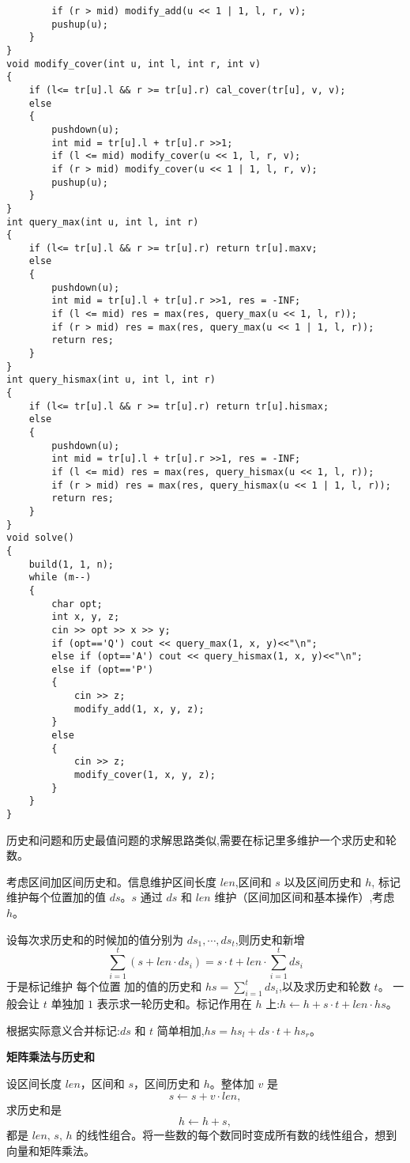 \documentclass[a4paper, fontset=none]{ctexart}
\begin{document}
\begin{verbatim}
        if (r > mid) modify_add(u << 1 | 1, l, r, v);
        pushup(u);
    }
}
void modify_cover(int u, int l, int r, int v)
{
    if (l<= tr[u].l && r >= tr[u].r) cal_cover(tr[u], v, v);
    else
    {
        pushdown(u);
        int mid = tr[u].l + tr[u].r >>1;
        if (l <= mid) modify_cover(u << 1, l, r, v);
        if (r > mid) modify_cover(u << 1 | 1, l, r, v);
        pushup(u);
    }
}
int query_max(int u, int l, int r)
{
    if (l<= tr[u].l && r >= tr[u].r) return tr[u].maxv;
    else
    {
        pushdown(u);
        int mid = tr[u].l + tr[u].r >>1, res = -INF;
        if (l <= mid) res = max(res, query_max(u << 1, l, r));
        if (r > mid) res = max(res, query_max(u << 1 | 1, l, r));
        return res;
    }
}
int query_hismax(int u, int l, int r)
{
    if (l<= tr[u].l && r >= tr[u].r) return tr[u].hismax;
    else
    {
        pushdown(u);
        int mid = tr[u].l + tr[u].r >>1, res = -INF;
        if (l <= mid) res = max(res, query_hismax(u << 1, l, r));
        if (r > mid) res = max(res, query_hismax(u << 1 | 1, l, r));
        return res;
    }
}
void solve()
{
    build(1, 1, n);
    while (m--)
    {
        char opt;
        int x, y, z;
        cin >> opt >> x >> y;
        if (opt=='Q') cout << query_max(1, x, y)<<"\n";
        else if (opt=='A') cout << query_hismax(1, x, y)<<"\n";
        else if (opt=='P')
        {
            cin >> z;
            modify_add(1, x, y, z);
        }
        else
        {
            cin >> z;
            modify_cover(1, x, y, z);
        }
    }
}
\end{verbatim}

历史和问题和历史最值问题的求解思路类似,需要在标记里多维护一个求历史和轮数。

考虑区间加区间历史和。信息维护区间长度 $len$,区间和 $s$ 以及区间历史和 $h$,
标记维护每个位置加的值 $ds$。$s$ 通过 $ds$ 和 $len$ 维护（区间加区间和基本操作）,考虑 $h$。

设每次求历史和的时候加的值分别为 $ds_1, \cdots, ds_t$,则历史和新增
$$
\sum_{i = 1} ^ t (s + len\cdot ds_i) = s\cdot t + len \cdot \sum_{i = 1} ^ t ds_i
$$
于是标记维护 每个位置 加的值的历史和 $hs = \sum_{i = 1} ^ t ds_i$,以及求历史和轮数 $t$。
一般会让 $t$ 单独加 $1$ 表示求一轮历史和。标记作用在 $h$ 上:$h\gets h + s\cdot t + len \cdot hs$。

根据实际意义合并标记:$ds$ 和 $t$ 简单相加,$hs = hs_l + ds\cdot t + hs_r$。


\textbf{矩阵乘法与历史和}

设区间长度 $len$，区间和 $s$，区间历史和 $h$。整体加 $v$ 是
\[
s \gets s + v \cdot len,
\]
求历史和是
\[
h \gets h + s,
\]
都是 $len,\, s,\, h$ 的线性组合。将一些数的每个数同时变成所有数的线性组合，想到向量和矩阵乘法。
\end{document}
